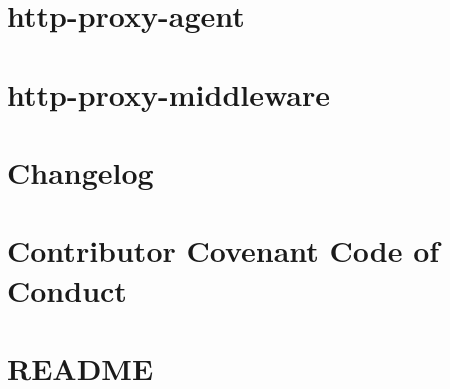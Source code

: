 \documentclass[twoside]{book}
\newcommand{\+}{\discretionary{\mbox{\scriptsize$\hookleftarrow$}}{}{}}
\begin{document}
\chapter{http-\/proxy-\/agent}
\label{md__c___users_vaishnavi_jadhav__desktop__developer_code_mean_stack_example_client_node_modules_http_proxy_agent__r_e_a_d_m_e}

\chapter{http-\/proxy-\/middleware}
\label{md__c___users_vaishnavi_jadhav__desktop__developer_code_mean_stack_example_client_node_modules_hd93043c16eeceed82d0470eebb3fa34e}

\chapter{Changelog}
\label{md__c___users_vaishnavi_jadhav__desktop__developer_code_mean_stack_example_client_node_modules_http_proxy__c_h_a_n_g_e_l_o_g}

\chapter{Contributor Covenant Code of Conduct}
\label{md__c___users_vaishnavi_jadhav__desktop__developer_code_mean_stack_example_client_node_modules_h35b1660e563fc8359c041aaa97915a15}

\chapter{README}
\label{md__c___users_vaishnavi_jadhav__desktop__developer_code_mean_stack_example_client_node_modules_http_proxy__r_e_a_d_m_e}

\end{document}
